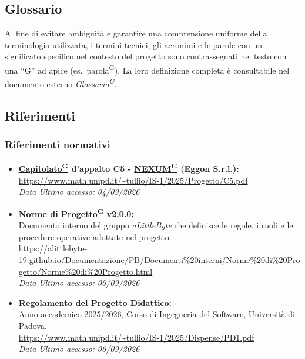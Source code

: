 \documentclass[a4paper,12pt]{article}
\providecommand{\glslink}[2]{\href{https://alittlebyte-19.github.io/Documentazione/glossario.html\#gls-#1}{\underline{#2}\textsuperscript{\scriptsize G}}}
\begin{document}
\subsection{Glossario}

Al fine di evitare ambiguità e garantire una comprensione uniforme della terminologia utilizzata, i termini tecnici, gli acronimi e le parole con un significato specifico nel contesto del progetto sono contrassegnati nel testo con una ``G'' ad apice (es.\ parola\textsuperscript{\scriptsize G}). La loro definizione completa è consultabile nel documento esterno \textit{\glslink{glossario}{Glossario}}.

\subsection{Riferimenti}

\subsubsection{Riferimenti normativi}
\begin{itemize}
    \item \textbf{\glslink{capitolato}{Capitolato} d'appalto C5 - \glslink{nexum}{NEXUM} (Eggon S.r.l.):}\\
    \url{https://www.math.unipd.it/~tullio/IS-1/2025/Progetto/C5.pdf}\\
    \textit{Data Ultimo accesso: 04/09/2026}

    \item \textbf{\glslink{norme-di-progetto}{Norme di Progetto} v2.0.0:}\\
    Documento interno del gruppo \textit{aLittleByte} che definisce le regole, i ruoli e le procedure operative adottate nel progetto.\\
    \url{https://alittlebyte-19.github.io/Documentazione/PB/Documenti\%20interni/Norme\%20di\%20Progetto/Norme\%20di\%20Progetto.html}\\
    \textit{Data Ultimo accesso: 05/09/2026}

    \item \textbf{Regolamento del Progetto Didattico:}\\
    Anno accademico 2025/2026, Corso di Ingegneria del Software, Università di Padova.\\
    \url{https://www.math.unipd.it/~tullio/IS-1/2025/Dispense/PD1.pdf}\\
    \textit{Data Ultimo accesso: 06/09/2026}
\end{itemize}
\end{document}
